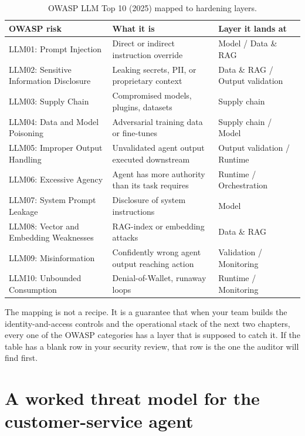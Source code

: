 \begin{table}[tb]
\centering
\small
\caption{OWASP LLM Top 10 (2025) mapped to hardening layers.}
\begin{tabularx}{\textwidth}{@{}p{}XX@{}}
\toprule
\textbf{OWASP risk} & \textbf{What it is} & \textbf{Layer it lands at} \\
\midrule
LLM01: Prompt Injection & Direct or indirect instruction override & Model / Data \& RAG \\
\addlinespace
LLM02: Sensitive Information Disclosure & Leaking secrets, PII, or proprietary context & Data \& RAG / Output validation \\
\addlinespace
LLM03: Supply Chain & Compromised models, plugins, datasets & Supply chain \\
\addlinespace
LLM04: Data and Model Poisoning & Adversarial training data or fine-tunes & Supply chain / Model \\
\addlinespace
LLM05: Improper Output Handling & Unvalidated agent output executed downstream & Output validation / Runtime \\
\addlinespace
LLM06: Excessive Agency & Agent has more authority than its task requires & Runtime / Orchestration \\
\addlinespace
LLM07: System Prompt Leakage & Disclosure of system instructions & Model \\
\addlinespace
LLM08: Vector and Embedding Weaknesses & RAG-index or embedding attacks & Data \& RAG \\
\addlinespace
LLM09: Misinformation & Confidently wrong agent output reaching action & Validation / Monitoring \\
\addlinespace
LLM10: Unbounded Consumption & Denial-of-Wallet, runaway loops & Runtime / Monitoring \\
\bottomrule
\end{tabularx}
\end{table}

The mapping is not a recipe. It is a guarantee that when your team builds the identity-and-access controls and the operational stack of the next two chapters, every one of the OWASP categories has a layer that is supposed to catch it. If the table has a blank row in your security review, that row is the one the auditor will find first.

\section{A worked threat model for the customer-service agent}

